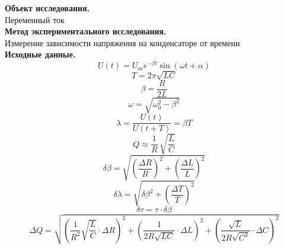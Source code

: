 \documentclass[ a4paper]{article}
\begin{document}
	{\parindent=0pt\textbf{Объект исследования.}}\\
	Переменный ток\\
	
	{\parindent=0pt\textbf{Метод экспериментального исследования.}}\\
	Измерение зависимости  напряжения на конденсаторе от времени\\
	
	{\parindent=0pt\textbf{Исходные данные.}}\\
	\begin{equation}
		U(t)=U_me^{-\beta t}\sin(\omega t + \alpha)
			\end{equation}
				\begin{equation}
			T=2\pi\sqrt{LC}
		\end{equation}
		\begin{equation}
			\beta = \frac{R}{2L}
		\end{equation}
			\begin{equation}
		\omega=\sqrt{\omega_0^2-\beta^2}
	\end{equation}
		\begin{equation}
	\lambda=\frac{U(t)}{U(t+T)}=\beta T
\end{equation}
		\begin{equation}
	Q\approx\frac{1}{R}\,\sqrt{\frac{L}{C}}
\end{equation}
		\begin{equation}
	\delta \beta=\sqrt{\left( \frac{\Delta R}{R}\right)^2 + \left( \frac{\Delta L}{L}\right)^2}
\end{equation}
		\begin{equation}
	\delta \lambda=\sqrt{\delta \beta^2 + \left( \frac{\Delta T}{T}\right)^2}
\end{equation}
		\begin{equation}
	\delta \tau=\tau\cdot\delta \beta
\end{equation}
		\begin{equation}
	\Delta Q=\sqrt{\left(\frac{1}{R^2}\sqrt{\frac{L}{C}}\cdot\Delta R \right)^2 + \left( \frac{1}{2R\sqrt{LC}}\cdot\Delta L\right)^2 + \left( \frac{\sqrt{L}}{2R\sqrt{C^3}}\cdot\Delta C\right)^2}
\end{equation}
\end{document}

